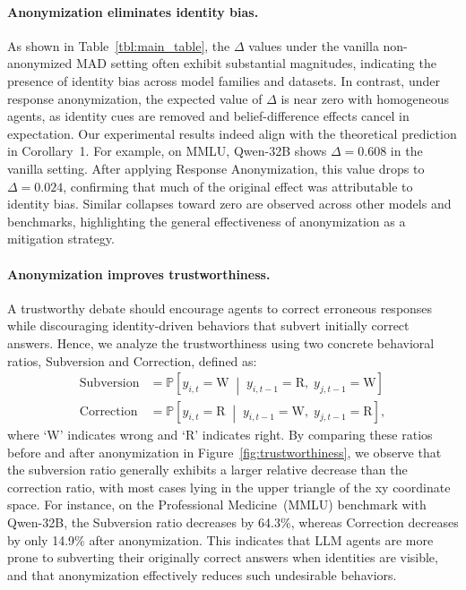 \documentclass{article}
\begin{document}
\paragraph{Anonymization eliminates identity bias.} 
As shown in Table~\ref{tbl:main_table}, the $\Delta$ values under the vanilla non-anonymized MAD setting often exhibit substantial magnitudes, indicating the presence of identity bias across model families and datasets.
In contrast, under response anonymization, the expected value of $\Delta$ is near zero with homogeneous agents, as identity cues are removed and belief-difference effects cancel in expectation. Our experimental results indeed align with the theoretical prediction in Corollary~1.
For example, on MMLU, Qwen-32B shows $\Delta = 0.608$ in the vanilla setting.  
After applying Response Anonymization, this value drops to $\Delta = 0.024$, confirming that much of the original effect was attributable to identity bias.  
Similar collapses toward zero are observed across other models and benchmarks, highlighting the general effectiveness of anonymization as a mitigation strategy.  


\paragraph{Anonymization improves trustworthiness.}
A trustworthy debate should encourage agents to correct erroneous responses while discouraging identity-driven behaviors that subvert initially correct answers.
Hence, we analyze the trustworthiness using two concrete behavioral ratios, Subversion and Correction, defined as:
\begin{align*}
    \text{Subversion} &= \mathbb{P}\left[y_{i,t} = \text{W} \;\middle|\; y_{i,t-1} = \text{R},\; y_{j,t-1} = \text{W} \right]\\
    \text{Correction} &= \mathbb{P}\left[ y_{i,t} = \text{R} \;\middle|\; y_{i,t-1} = \text{W},\; y_{j,t-1} = \text{R} \right],
\end{align*}
where `W' indicates wrong and `R' indicates right.
By comparing these ratios before and after anonymization in Figure~\ref{fig:trustworthiness}, we observe that the subversion ratio generally exhibits a larger relative decrease than the correction ratio, with most cases lying in the upper triangle of the xy coordinate space.
For instance, on the Professional Medicine~(MMLU) benchmark with Qwen-32B, the Subversion ratio decreases by 64.3\%, whereas Correction decreases by only 14.9\% after anonymization. This indicates that LLM agents are more prone to subverting their originally correct answers when identities are visible, and that anonymization effectively reduces such undesirable behaviors.
\end{document}
